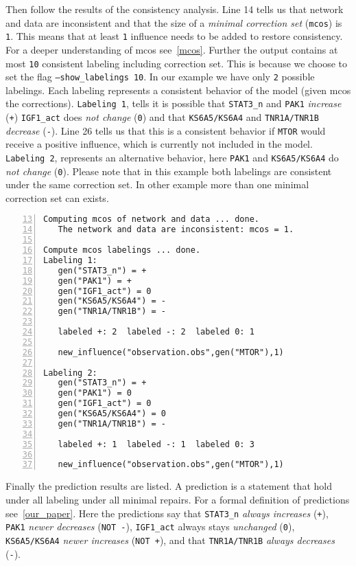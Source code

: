 \documentclass{article}
\begin{document}
Then follow the results of the consistency analysis.
Line 14 tells us that network and data are inconsistent 
and that the size of a \emph{minimal correction set} (\texttt{mcos}) is \texttt{1}.
This means that at least \texttt{1} influence needs to be added to restore consistency.
For a deeper understanding of mcos see~\ref{mcos}.
Further the output contains at most \texttt{10} consistent labeling including correction set. 
This is because we choose to set the flag \texttt{--show\_labelings 10}.
In our example we have only \texttt{2} possible labelings. 
Each labeling represents a consistent behavior of the model (given mcos the corrections).
\texttt{Labeling 1},
tells it is possible that 
\texttt{STAT3\_n} and \texttt{PAK1} \emph{increase} (\texttt{+})
\texttt{IGF1\_act} does \emph{not change} (\texttt{0}) and that
\texttt{KS6A5/KS6A4} and \texttt{TNR1A/TNR1B} \emph{decrease} (\texttt{-}).
Line 26 tells us that this is a consistent behavior if \texttt{MTOR} would receive a positive influence, 
which is currently not included in the model.
\texttt{Labeling 2}, represents an alternative behavior,
 here  \texttt{PAK1} and \texttt{KS6A5/KS6A4} do \emph{not change} (\texttt{0}).
Please note that in this example both labelings are consistent under the same correction set.
In other example more than one minimal correction set can exists.

\begin{Verbatim}[frame=single,numbers=left,firstnumber=13]  
Computing mcos of network and data ... done.
   The network and data are inconsistent: mcos = 1.
  
Compute mcos labelings ... done.
Labeling 1:
   gen("STAT3_n") = +
   gen("PAK1") = +
   gen("IGF1_act") = 0
   gen("KS6A5/KS6A4") = -
   gen("TNR1A/TNR1B") = -

   labeled +: 2  labeled -: 2  labeled 0: 1 

   new_influence("observation.obs",gen("MTOR"),1)
   
Labeling 2:
   gen("STAT3_n") = +
   gen("PAK1") = 0
   gen("IGF1_act") = 0
   gen("KS6A5/KS6A4") = 0
   gen("TNR1A/TNR1B") = -

   labeled +: 1  labeled -: 1  labeled 0: 3 
   
   new_influence("observation.obs",gen("MTOR"),1)
\end{Verbatim}

Finally the prediction results are listed.
A prediction is a statement that hold under all labeling under all minimal repairs. 
For a formal definition of predictions see~\ref{our_paper}.
Here the predictions say that 
\texttt{STAT3\_n} \emph{always increases} (\texttt{+}),
\texttt{PAK1} \emph{newer decreases} (\texttt{NOT -}),
\texttt{IGF1\_act} always stays \emph{unchanged} (\texttt{0}),
\texttt{KS6A5/KS6A4} \emph{newer increases} (\texttt{NOT +}), and that
\texttt{TNR1A/TNR1B} \emph{always decreases} (\texttt{-}).
\end{document}
